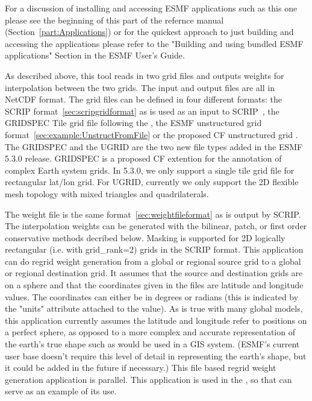 For a discussion of installing and accessing ESMF applications such as this one please see the beginning of this part of the refernce manual (Section~\ref{part:Applications}) or for the quickest approach to just building and accessing the applications please refer to the "Building and using bundled ESMF applications" Section in the ESMF User's Guide.

As described above, this tool reads in
two grid files and outputs weights for interpolation
between the two grids. The input and output files are all in NetCDF format. The grid files can be defined in four
different formats:  the SCRIP format~\ref{sec:scripgridformat} as is used as an input to SCRIP~\cite{ref:SCRIP}, the GRIDSPEC Tile grid file following the
, 
the ESMF unstructured grid format~\ref{sec:example:UnstructFromFile} or the proposed CF unstructured grid 
. The GRIDSPEC and the UGRID are the two new file types added 
in the ESMF 5.3.0 release.  GRIDSPEC is a proposed CF extention for the annotation of complex
Earth system grids.  In 5.3.0, we only support a single tile grid file for rectangular lat/lon grid.  For UGRID, currently we only support the 2D flexible mesh topology with mixed triangles and quadrilaterals.

The weight file is the same format~\ref{sec:weightfileformat} as is 
output by SCRIP. The interpolation weights can be generated with
the bilinear, patch, or first order conservative methods decribed below. Masking is supported for 2D logically rectangular (i.e. with grid\_rank=2) grids in the SCRIP format. This application 
can do regrid weight generation from a global or regional source grid to a global or regional destination grid.
It assumes that the source and destination grids are on a sphere and that the coordinates given in 
the files are latitude and longitude values. The coordinates can either be in degrees or radians (this is indicated by the "units" attribute attached to the value). 
As is true with many global models, this application currently assumes the latitude and longitude refer to positions on a perfect sphere, as opposed to a more complex 
and accurate representation of the earth's true shape such as would be used in a GIS system. (ESMF's current user base doesn't require this level of detail in representing the earth's shape, but it could be added in the future if necessary.)  This file based regrid weight generation application 
is parallel. This application is used in the
, so that can serve as an example of its use.

